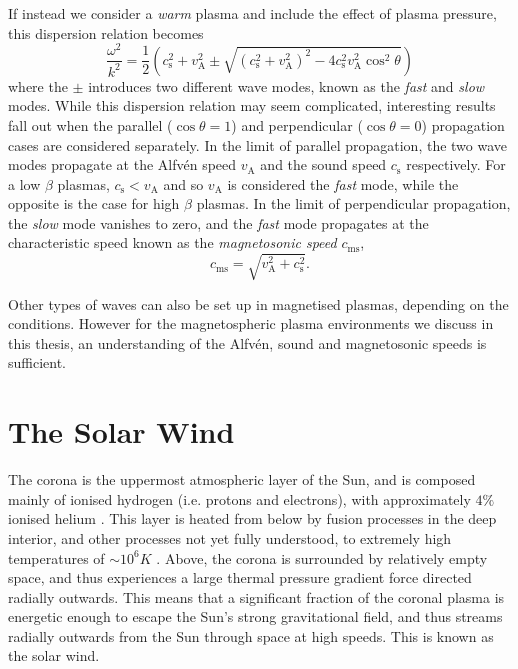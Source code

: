If instead we consider a \textit{warm} plasma and include the effect of plasma pressure, this dispersion relation becomes
\begin{equation}
\frac{\omega^2}{k^2} = \frac{1}{2}\left(c_\mathrm{s}^2+v_\mathrm{A}^2\pm\sqrt{(c_\mathrm{s}^2+v_\mathrm{A}^2)^2-4c_\mathrm{s}^2v_\mathrm{A}^2\cos^2\theta}\right)
\end{equation}
where the $\pm$ introduces two different wave modes, known as the \textit{fast} and \textit{slow} modes. While this dispersion relation may seem complicated, interesting results fall out when the parallel ($\cos\theta = 1$) and perpendicular ($\cos\theta = 0$) propagation cases are considered separately. In the limit of parallel propagation, the two wave modes propagate at the Alfv\'en speed $v_\mathrm{A}$ and the sound speed $c_\mathrm{s}$ respectively. For a low $\beta$ plasmas, $c_\mathrm{s}<v_\mathrm{A}$ and so $v_\mathrm{A}$ is considered the \textit{fast} mode, while the opposite is the case for high $\beta$ plasmas. In the limit of perpendicular propagation, the \textit{slow} mode vanishes to zero, and the \textit{fast} mode propagates at the characteristic speed known as the \textit{magnetosonic speed} $c_\mathrm{ms}$,
\begin{equation}
c_\mathrm{ms} = \sqrt{v_\mathrm{A}^2+c_\mathrm{s}^2}.
\end{equation}

Other types of waves can also be set up in magnetised plasmas, depending on the conditions. However for the magnetospheric plasma environments we discuss in this thesis, an understanding of the Alfv\'en, sound and magnetosonic speeds is sufficient.

\section{The Solar Wind} \label{intro:sec:solarwind}
The corona is the uppermost atmospheric layer of the Sun, and is composed mainly of ionised hydrogen (i.e. protons and electrons), with approximately $4\%$ ionised helium \citep{robbins1970}. This layer is heated from below by fusion processes in the deep interior, and other processes not yet fully understood, to extremely high temperatures of ${\sim}10^6\si{K}$ \citep{warren2009}. Above, the corona is surrounded by relatively empty space, and thus experiences a large thermal pressure gradient force directed radially outwards. This means that a significant fraction of the coronal plasma is energetic enough to escape the Sun's strong gravitational field, and thus streams radially outwards from the Sun through space at high speeds. This is known as the solar wind.

